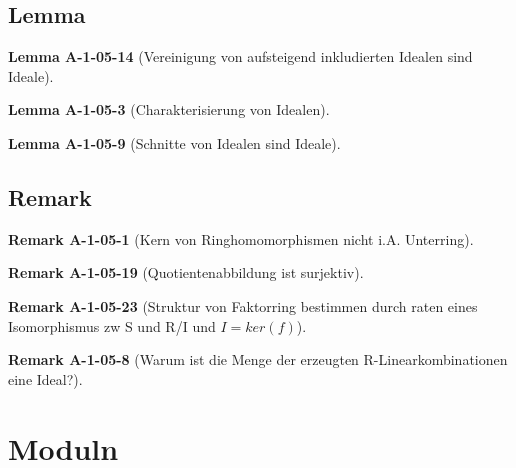 \documentclass[10pt, letterpaper]{article}
\newcommand{\CustomHeading}[3]{%
  \par\medskip\noindent%
  \textbf{#1 #2} \textnormal{(#3)}.\enskip%
}
\newenvironment{LEM}[2]{\CustomHeading{Lemma}{#1}{#2}}{}
\newenvironment{REM}[2]{\CustomHeading{Remark}{#1}{#2}}{}
\begin{document}
\subsection{Lemma}



\begin{LEM}{A-1-05-14}{Vereinigung von aufsteigend inkludierten Idealen sind Ideale}

\end{LEM}

\begin{LEM}{A-1-05-3}{Charakterisierung von Idealen}

\end{LEM}

\begin{LEM}{A-1-05-9}{Schnitte von Idealen sind Ideale}

\end{LEM}





\subsection{Remark}



\begin{REM}{A-1-05-1}{Kern von Ringhomomorphismen nicht i.A. Unterring}

\end{REM}

\begin{REM}{A-1-05-19}{Quotientenabbildung ist surjektiv}

\end{REM}

\begin{REM}{A-1-05-23}{Struktur von Faktorring bestimmen durch raten eines Isomorphismus zw S und R/I und $I=ker(f)$}

\end{REM}

\begin{REM}{A-1-05-8}{Warum ist die Menge der erzeugten R-Linearkombinationen eine Ideal?}

\end{REM}








\section{Moduln}
\end{document}
